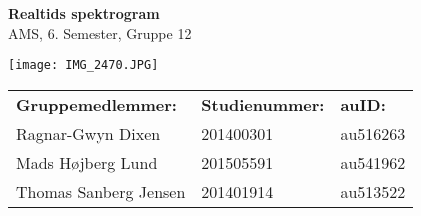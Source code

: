 \begingroup
\thispagestyle{empty}
\centering
\Huge{\textbf{Realtids spektrogram}}\\
{\Large AMS, 6. Semester, Gruppe 12}

\begin{center}
	\texttt{[image: IMG\_2470.JPG]}
\end{center}
{\small
	\begin{center}
		\begin{tabu} to 0.8\textwidth { X[l,2]  X[c,1] X[c,1] }
			\textbf{Gruppemedlemmer:}		& \textbf{Studienummer:}	& \textbf{auID:}\\
			Ragnar-Gwyn Dixen 		& 201400301		& au516263\\
			Mads Højberg Lund		& 201505591		& au541962\\
			Thomas Sanberg Jensen	& 201401914 	& au513522\\
		\end{tabu}
\end{center}}
\endgroup
\newpage
%